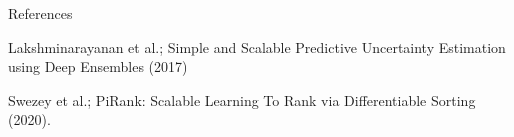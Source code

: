 \documentclass{beamer}
\begin{document}
\begin{frame}[t]{References}

\begin{thebibliography}{1}

\alert{Lakshminarayanan et al.; Simple and Scalable Predictive Uncertainty Estimation using Deep Ensembles (2017)}

\alert{Swezey et al.;  PiRank: Scalable Learning To Rank via Differentiable Sorting (2020).}

\end{thebibliography}

\end{frame}

\end{document}
